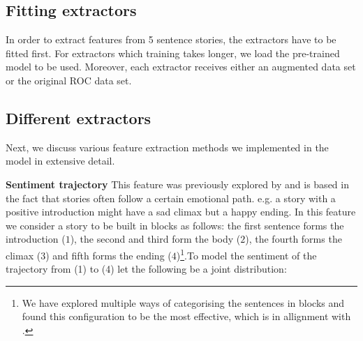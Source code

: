 \documentclass{article}
\begin{document}
\subsection{Fitting extractors}

In order to extract features from 5 sentence stories, the extractors have to be
fitted first. For extractors which training takes longer, we load the
pre-trained model to be used. Moreover, each extractor receives either an
augmented data set or the original ROC data set.


\subsection{Different extractors}
\label{sec:extractors}

Next, we discuss various feature extraction methods we implemented in the model
in extensive detail.

\textbf{Sentiment trajectory} This feature was previously explored by \cite{COGCOMP} and is based in the fact that stories often follow a certain emotional path. e.g. a story with a positive introduction might have a sad climax but a happy ending. In this feature we consider a story to be built in blocks as follows: the first sentence forms the introduction ($1$), the second and third form the body ($2$), the fourth forms the climax ($3$) and fifth forms the ending ($4$)\footnote{We have explored multiple ways of categorising the sentences in blocks and found this configuration to be the most effective, which is in allignment with \cite{COGCOMP}.}.To model the sentiment of the trajectory from (1) to (4) let the following be a joint distribution:
\end{document}
